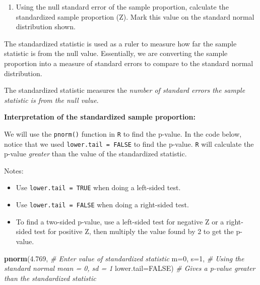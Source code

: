 \documentclass[
]{report}
\newenvironment{Shaded}{\begin{snugshade}}{\end{snugshade}}
\newcommand{\AttributeTok}[1]{\textcolor[rgb]{0.13,0.29,0.53}{#1}}
\newcommand{\CommentTok}[1]{\textcolor[rgb]{0.56,0.35,0.01}{\textit{#1}}}
\newcommand{\ConstantTok}[1]{\textcolor[rgb]{0.56,0.35,0.01}{#1}}
\newcommand{\DecValTok}[1]{\textcolor[rgb]{0.00,0.00,0.81}{#1}}
\newcommand{\FloatTok}[1]{\textcolor[rgb]{0.00,0.00,0.81}{#1}}
\newcommand{\FunctionTok}[1]{\textcolor[rgb]{0.13,0.29,0.53}{\textbf{#1}}}
\newcommand{\NormalTok}[1]{#1}
\providecommand{\tightlist}{%
  \setlength{\itemsep}{0pt}\setlength{\parskip}{0pt}}
\begin{document}
\begin{enumerate}
\def\labelenumi{\arabic{enumi}.}
\setcounter{enumi}{5}
\tightlist
\item
  Using the null standard error of the sample proportion, calculate the standardized sample proportion (Z). Mark this value on the standard normal distribution shown.
\end{enumerate}

\vspace{0.6in}

The standardized statistic is used as a ruler to measure how far the sample statistic is from the null value. Essentially, we are converting the sample proportion into a measure of standard errors to compare to the standard normal distribution.

The standardized statistic measures the \emph{number of standard errors the sample statistic is from the null value}.

\textbf{Interpretation of the standardized sample proportion:}

\vspace{.8in}

We will use the \texttt{pnorm()} function in \texttt{R} to find the p-value. In the code below, notice that we used \texttt{lower.tail\ =\ FALSE} to find the p-value. \texttt{R} will calculate the p-value \emph{greater} than the value of the standardized statistic.

Notes:

\begin{itemize}
\tightlist
\item
  Use \texttt{lower.tail\ =\ TRUE} when doing a left-sided test.
\item
  Use \texttt{lower.tail\ =\ FALSE} when doing a right-sided test.
\item
  To find a two-sided p-value, use a left-sided test for negative Z or a right-sided test for positive Z, then multiply the value found by 2 to get the p-value.
\end{itemize}

\begin{Shaded}
\begin{Highlighting}[]
\FunctionTok{pnorm}\NormalTok{(}\FloatTok{4.769}\NormalTok{, }\CommentTok{\# Enter value of standardized statistic}
      \AttributeTok{m=}\DecValTok{0}\NormalTok{, }\AttributeTok{s=}\DecValTok{1}\NormalTok{, }\CommentTok{\# Using the standard normal mean = 0, sd = 1}
      \AttributeTok{lower.tail=}\ConstantTok{FALSE}\NormalTok{) }\CommentTok{\# Gives a p{-}value greater than the standardized statistic}
\end{Highlighting}
\end{Shaded}
\end{document}
